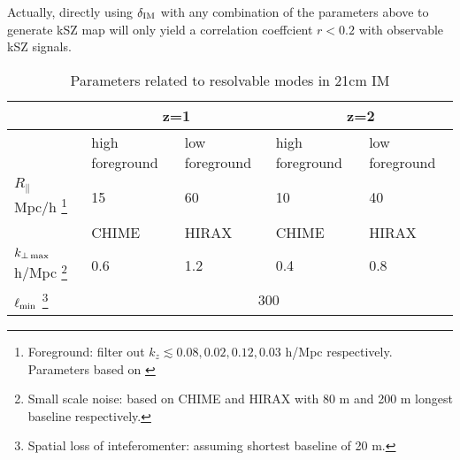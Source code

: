 Actually, directly using $\delta_\mathrm{IM}$ with any combination of the parameters above to generate kSZ map will only yield a correlation coeffcient $r<0.2$ with observable kSZ signals. 
\begin{table}
\begin{tabular}{|m{2cm}|m{1.5cm}|m{1.5cm}|m{1.5cm}|m{1.5cm}|}
    \hline
     & \multicolumn{2}{|c|}{z=1} &\multicolumn{2}{|c|}{z=2}\\
     \hline
     & high foreground &low foreground&high foreground& low foreground\\
     \cline{2-5}
     $R_\parallel$ Mpc/h
     \footnote{Foreground: filter out $k_z\lesssim 0.08,0.02,0.12,0.03$ h/Mpc respectively. Parameters based on \cite{2013ApJ...763L..20M,Switzer13,15Shaw}}
      & 15 & 60 & 10 & 40 \\
     \hline
     & CHIME & HIRAX & CHIME &HIRAX\\
     \cline{2-5}
     $k_{\perp\,\mathrm{max}}$ h/Mpc 
     \footnote{Small scale noise: based on CHIME\cite{2014CHIME} and HIRAX\cite{HIRAX} 
     with 80 m and 200 m longest baseline respectively.}
     & 0.6 & 1.2 & 0.4 & 0.8 \\
     \hline
     $\ell_\mathrm{min}$
     \footnote{Spatial loss of inteferomenter: assuming shortest baseline of 20 m.}
     & \multicolumn{4}{|c|}{300} \\
     \hline
\end{tabular}
     \caption{Parameters related to resolvable modes in 21cm IM}
     \label{tab:para}
\end{table}
